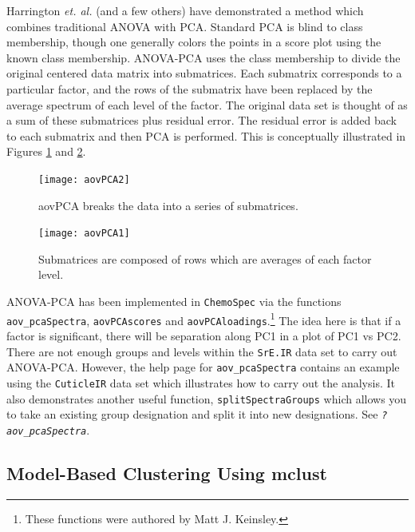 \documentclass[letter,10pt,twocolumn,twoside,printwatermark=false]{pinp}
\begin{document}
Harrington \emph{et. al.}\citep{Harrington2005} (and a few
others\citep{Pinto2008}) have demonstrated a method which combines
traditional ANOVA with PCA. Standard PCA is blind to class membership,
though one generally colors the points in a score plot using the known
class membership. ANOVA-PCA uses the class membership to divide the
original centered data matrix into submatrices. Each submatrix
corresponds to a particular factor, and the rows of the submatrix have
been replaced by the average spectrum of each level of the factor. The
original data set is thought of as a sum of these submatrices plus
residual error. The residual error is added back to each submatrix and
then PCA is performed. This is conceptually illustrated in Figures
\ref{aovPCA2} and \ref{aovPCA1}.

\begin{figure}
\begin{center}
\texttt{[image: aovPCA2]}
\caption{\label{aovPCA2}aovPCA breaks the data into a series of submatrices.}
\end{center}
\end{figure}

\begin{figure}
\begin{center}
\texttt{[image: aovPCA1]}
\caption{\label{aovPCA1}Submatrices are composed of rows which are averages of each factor level.}
\end{center}
\end{figure}

ANOVA-PCA has been implemented in \texttt{ChemoSpec} via the functions
\texttt{aov\_pcaSpectra}, \texttt{aovPCAscores} and
\texttt{aovPCAloadings}.\footnote{These functions were authored by Matt J. Keinsley.}
The idea here is that if a factor is significant, there will be
separation along PC1 in a plot of PC1 vs PC2. There are not enough
groups and levels within the \texttt{SrE.IR} data set to carry out
ANOVA-PCA. However, the help page for \texttt{aov\_pcaSpectra} contains
an example using the \texttt{CuticleIR} data set which illustrates how
to carry out the analysis. It also demonstrates another useful function,
\texttt{splitSpectraGroups} which allows you to take an existing group
designation and split it into new designations. See
\texttt{\textsl{?aov\_pcaSpectra}}.

\hypertarget{model-based-clustering-using-mclust}{%
\subsection{Model-Based Clustering Using
mclust}\label{model-based-clustering-using-mclust}}
\end{document}
